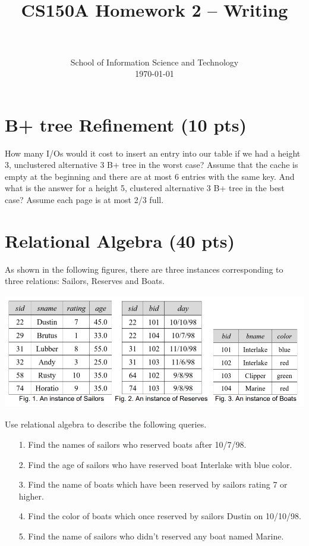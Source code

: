 \documentclass{article}
\title{
	\usefont{OT1}{bch}{b}{n}
	\horrule{0.5pt} \\[0.4cm]
	\huge CS150A Homework 2 -- Writing \\
	\horrule{2pt} \\[0.5cm]
}
\author{
	\normalfont 								\normalsize
	School of Information Science and Technology \\
	[-3pt]		\normalsize
	\today
}
\begin{document}
\maketitle

\section{B+ tree Refinement (10 pts)}

How many I/Os would it cost to insert an entry into our table if we had a height 3, unclustered alternative 3 B+ tree in the worst case? Assume that the cache is empty at the beginning and there are at most 6 entries with the same key. And what is the answer for a height 5, clustered alternative 3 B+ tree in the best case? Assume each page is at most 2/3 full. \\   


\section{Relational Algebra (40 pts)}

    As shown in the following figures, there are three instances corresponding to three relations:
Sailors, Reserves and Boats.
\begin{center}
    \includegraphics[height =5cm]{RA.png}
\end{center}
Use relational algebra to describe the following queries.
\begin{itemize}
    \item [1.] Find the names of sailors who reserved boats after 10/7/98.\\
    \item [2.] Find the age of sailors who have reserved boat Interlake with blue color. \\
    \item [3.] Find the name of boats which have been reserved by sailors rating 7 or higher.\\
    \item [4.] Find the color of boats which once reserved by sailors Dustin on 10/10/98.\\
    \item [5.] Find the name of sailors who didn't reserved any boat named Marine.\\
\end{itemize}
\end{document}
